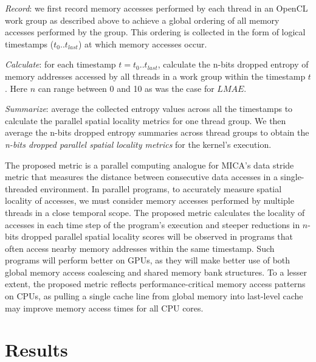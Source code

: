 \documentclass[review=false, sigchi]{acmart}
\begin{document}
	\textit{Record}: we first record memory accesses performed by each thread in an OpenCL work group as described above to achieve a global ordering of all memory accesses performed by the group.
	This ordering is collected in the form of logical timestamps ($t_0 .. t_{last}$) at which memory accesses occur.
	
	\textit{Calculate}: for each timestamp $t = t_0 .. t_{last}$, calculate the n-bits dropped entropy of memory addresses accessed by all threads in a work group within the timestamp $t$. Here $n$ can range between 0 and 10 as was the case for $LMAE$.
	
	\textit{Summarize}: average the collected entropy values across all the timestamps to calculate the parallel spatial locality metrics for one thread group. We then average the n-bits dropped entropy summaries across thread groups to obtain the \textit{n-bits dropped parallel spatial locality metrics} for the kernel's execution.
	
	

	The proposed metric is a parallel computing analogue for MICA's data stride metric that measures the distance between consecutive data accesses in a single-threaded environment. 
	In parallel programs, to accurately measure spatial locality of accesses, we must consider memory accesses performed by multiple threads in a close temporal scope. 
	The proposed metric calculates the locality of accesses in each time step of the program's execution and steeper reductions in $n$-bits dropped parallel spatial locality scores will be observed in programs that often access nearby memory addresses within the same timestamp.
	Such programs will perform better on GPUs, as they will make better use of both global memory access coalescing and shared memory bank structures.
	To a lesser extent, the proposed metric reflects performance-critical memory access patterns on CPUs, as pulling a single cache line from global memory into last-level cache may improve memory access times for all CPU cores.
	
	\section{Results} \label{results}
	
\end{document}
